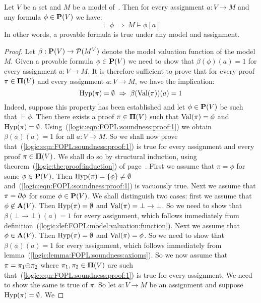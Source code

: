 \begin{theorem}[Soundness]\label{logic:the:FOPL:soundness:soundness}
Let $V$ be a set and $M$ be a model of\, \pv. Then for every
assignment $a:V\to M$ and any formula $\phi\in\mbox{${\bf P}(V)$}$ we have:
    \[
    \vdash\phi\ \Rightarrow\ M\vDash\phi[a]
    \]
In other words, a provable formula is true under any model and
assignment.
\end{theorem}
\begin{proof}
Let $\beta:\mbox{${\bf P}(V)$}\to{\cal P}(M^{V})$ denote the model valuation
function of the model $M$. Given a provable formula $\phi\in\mbox{${\bf P}(V)$}$ we
need to show that $\beta(\phi)(a)=1$ for every assignment $a:V\to
M$. It is therefore sufficient to prove that for every proof
$\pi\in\mbox{${\bf\Pi}(V)$}$ and every assignment $a:V\to M$, we have the
implication:
    \begin{equation}\label{logic:eqn:FOPL:soundness:proof:1}
    \mbox{\rm Hyp}(\pi)=\emptyset\ \Rightarrow\ \beta(\mbox{\rm Val}(\pi))(a)=1
    \end{equation}
Indeed, suppose this property has been established and let
$\phi\in\mbox{${\bf P}(V)$}$ be such that $\vdash\phi$. Then there exists a proof
$\pi\in\mbox{${\bf\Pi}(V)$}$ such that $\mbox{\rm Val}(\pi)=\phi$ and $\mbox{\rm Hyp}(\pi)=\emptyset$.
Using~(\ref{logic:eqn:FOPL:soundness:proof:1}) we obtain
$\beta(\phi)(a)=1$ for all $a:V\to M$. So we shall now prove
that~(\ref{logic:eqn:FOPL:soundness:proof:1}) is true for every
assignment and every proof $\pi\in\mbox{${\bf\Pi}(V)$}$. We shall do so by
structural induction, using
theorem~(\ref{logic:the:proof:induction}) of
page~\pageref{logic:the:proof:induction}. First we assume that
$\pi=\phi$ for some $\phi\in\mbox{${\bf P}(V)$}$. Then
$\mbox{\rm Hyp}(\pi)=\{\phi\}\neq\emptyset$
and~(\ref{logic:eqn:FOPL:soundness:proof:1}) is vacuously true. Next
we assume that $\pi=\mbox{$\partial$}\phi$ for some $\phi\in\mbox{${\bf P}(V)$}$. We shall
distinguish two cases: first we assume that $\phi\not\in\mbox{${\bf A}(V)$}$. Then
$\mbox{\rm Hyp}(\pi)=\emptyset$ and $\mbox{\rm Val}(\pi)=\bot\to\bot$. So we need to
show that $\beta(\bot\to\bot)(a)=1$ for every assignment, which
follows immediately from
definition~(\ref{logic:def:FOPL:model:valuation:function}). Next we
assume that $\phi\in\mbox{${\bf A}(V)$}$. Then $\mbox{\rm Hyp}(\pi)=\emptyset$ and
$\mbox{\rm Val}(\pi)=\phi$. So we need to show that $\beta(\phi)(a)=1$ for
every assignment, which follows immediately from
lemma~(\ref{logic:lemma:FOPL:soundness:axioms}). So we now assume
that $\pi=\pi_{1}\mbox{$\oplus$}\pi_{2}$ where $\pi_{1},\pi_{2}\in\mbox{${\bf\Pi}(V)$}$ are
such that~(\ref{logic:eqn:FOPL:soundness:proof:1}) is true for every
assignment. We need to show the same is true of $\pi$. So let
$a:V\to M$ be an assignment and suppose $\mbox{\rm Hyp}(\pi)=\emptyset$. We

\end{proof}
